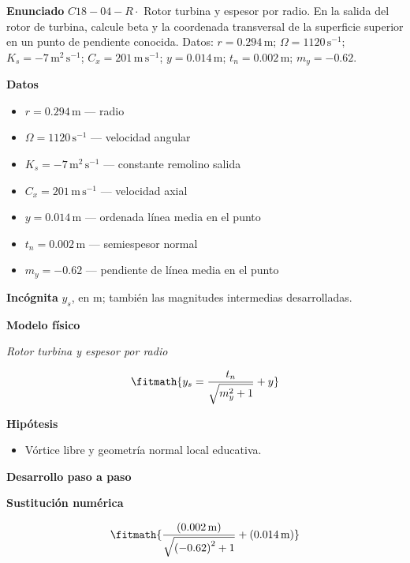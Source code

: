 \documentclass[10pt,openany]{book}
\begin{document}
\begin{tcolorbox}[title={Problema resuelto 4}, studiumworked, breakable]

\noindent\textbf{Enunciado}
\(C18-04-R \cdot\) Rotor turbina y espesor por radio. En la salida del rotor de turbina, calcule beta y la coordenada transversal de la superficie superior en un punto de pendiente conocida. Datos: \(r=0.294\, \mathrm{m}\); \(\Omega=1120\, \mathrm{s}^{-1}\); \(K_s=-7\, \mathrm{m}^{2}\,\mathrm{s}^{-1}\); \(C_x=201\, \mathrm{m}\,\mathrm{s}^{-1}\); \(y=0.014\, \mathrm{m}\); \(t_n=0.002\, \mathrm{m}\); \(m_y=-0.62\).

\noindent\textbf{Datos}
\begin{itemize}
\item $r = 0.294\,\mathrm{m}$ — radio
\item $\Omega = 1120\,\mathrm{s}^{-1}$ — velocidad angular
\item $K_s = -7\,\mathrm{m}^{2}\,\mathrm{s}^{-1}$ — constante remolino salida
\item $C_x = 201\,\mathrm{m}\,\mathrm{s}^{-1}$ — velocidad axial
\item $y = 0.014\,\mathrm{m}$ — ordenada línea media en el punto
\item $t_n = 0.002\,\mathrm{m}$ — semiespesor normal
\item $m_y = -0.62$ — pendiente de línea media en el punto
\end{itemize}

\noindent\textbf{Incógnita}
$y_s$, en $\mathrm{m}$; también las magnitudes intermedias desarrolladas.

\noindent\textbf{Modelo físico}

\noindent\textit{Rotor turbina y espesor por radio}

\[
\fitmath{y_s=\frac{t_n}{\sqrt{m_y^{2} + 1}} + y}
\]

\noindent\textbf{Hipótesis}
\begin{itemize}
\item Vórtice libre y geometría normal local educativa.
\end{itemize}

\noindent\textbf{Desarrollo paso a paso}



\noindent\textbf{Sustitución numérica}

\[
\fitmath{\frac{\left(0.002\,\mathrm{m}\right)}{\sqrt{\left(-0.62\right)^{2} + 1}} + \left(0.014\,\mathrm{m}\right)}
\]


\end{tcolorbox}
\end{document}
